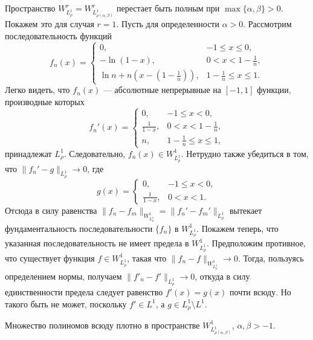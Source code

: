 Пространство $W^r_{L^1_\rho}=W^r_{L^1_{\rho(\alpha, \beta)}}$ перестает быть полным при $\max\{\alpha,\beta\} > 0$. Покажем это для случая $r=1$. Пусть для определенности $\alpha>0$. Рассмотрим последовательность функций
\begin{equation*}
	f_n(x)=
	\begin{cases}
		0, &-1 \le x \le 0,\\
		-\ln (1-x), &0<x<1-\frac{1}{n},\\
		\ln n + n(x-(1-\frac{1}{n})), &1-\frac{1}{n} \le x \le 1.
	\end{cases}
\end{equation*}
Легко видеть, что $f_n(x)$ --- абсолютные непрерывные на $[-1,1]$ функции, производные которых
\begin{equation*}
	f_n'(x)=
	\begin{cases}
		0, &-1 \le x < 0,\\
		\frac{1}{1-x}, &0<x<1-\frac{1}{n},\\
		n, &1-\frac{1}{n} \le x \le 1,
	\end{cases}
\end{equation*}
принадлежат $L^1_{\rho}$. Следовательно, $f_n(x) \in W^1_{L^1_{\rho}}$.
Нетрудно также убедиться в том, что $\|f_n'-g\|_{L^1_\rho} \to 0$, где
\begin{equation*}
	g(x)=
	\begin{cases}
		0, &-1 \le x < 0,\\
		\frac{1}{1-x}, &0<x<1.
	\end{cases}	
\end{equation*}
Отсюда в силу равенства $\|f_n-f_m\|_{W^1_{L^1_{\rho}}} = \|f_n'-f_m'\|_{L^1_\rho}$ вытекает фундаментальность последовательности $\{f_n\}$ в $W^1_{L^1_{\rho}}$. Покажем теперь, что указанная последовательность не имеет предела в $W^1_{L^1_{\rho}}$. Предположим противное, что существует функция $f \in W^1_{L^1_{\rho}}$, такая что $\|f_n-f\|_{W^1_{L^1_{\rho}}} \to 0$. Тогда, пользуясь определением нормы, получаем $\|f'_n-f'\|_{L^1_{\rho}} \to 0$, откуда в силу единственности предела следует равенство $f'(x)=g(x)$ почти всюду. Но такого быть не может, поскольку $f' \in L^1$, а $g \in L^1_\rho \setminus L^1$.

\begin{lemma}\label{mmg-pol-dense}
	Множество полиномов всюду плотно в пространстве $W^1_{L^1_{\rho(\alpha,\beta)}}$, $\alpha, \beta > -1$.
\end{lemma}





